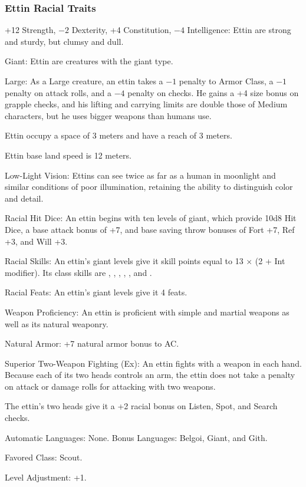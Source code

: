 \subsubsection{Ettin Racial Traits}
\begin{itemize*}
    \item +12 Strength, $-2$ Dexterity, +4 Constitution, $-4$ Intelligence: Ettin are strong and sturdy, but clumsy and dull.
    \item Giant: Ettin are creatures with the giant type.
    \item Large: As a Large creature, an ettin takes a $-1$ penalty to Armor Class, a $-1$ penalty on attack rolls, and a $-4$ penalty on  checks. He gains a +4 size bonus on grapple checks, and his lifting and carrying limits are double those of Medium characters, but he uses bigger weapons than humans use.
    \item Ettin occupy a space of 3 meters and have a reach of 3 meters.
    \item Ettin base land speed is 12 meters.

    \item Low-Light Vision: Ettins can see twice as far as a human in moonlight and similar conditions of poor illumination, retaining the ability to distinguish color and detail.

    \item Racial Hit Dice: An ettin begins with ten levels of giant, which provide 10d8 Hit Dice, a base attack bonus of +7, and base saving throw bonuses of Fort +7, Ref +3, and Will +3.
    \item Racial Skills: An ettin's giant levels give it skill points equal to 13 $\times$ (2 + Int modifier). Its class skills are , , , , , and .
    \item Racial Feats: An ettin's giant levels give it 4 feats.
    \item Weapon Proficiency: An ettin is proficient with simple and martial weapons as well as its natural weaponry.

    \item Natural Armor: +7 natural armor bonus to AC.

    \item Superior Two-Weapon Fighting (Ex): An ettin fights with a weapon in each hand. Because each of its two heads controls an arm, the ettin does not take a penalty on attack or damage rolls for attacking with two weapons.
    \item The ettin's two heads give it a +2 racial bonus on Listen, Spot, and Search checks.

    \item Automatic Languages: None. Bonus Languages: Belgoi, Giant, and Gith.
    \item Favored Class: Scout.
    \item Level Adjustment: +1.
\end{itemize*}
